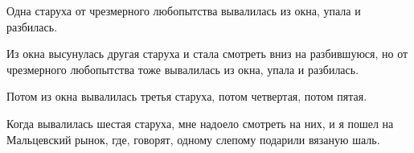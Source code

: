 Одна старуха от чрезмерного любопытства вывалилась из окна, упала и разбилась.

Из окна высунулась другая старуха и стала смотреть вниз на разбившуюся, но от чрезмерного любопытства тоже вывалилась из окна, упала и разбилась.

Потом из окна вывалилась третья старуха, потом четвертая, потом пятая.

Когда вывалилась шестая старуха, мне надоело смотреть на них, и я пошел на Мальцевский рынок, где, говорят, одному слепому подарили вязаную шаль.
